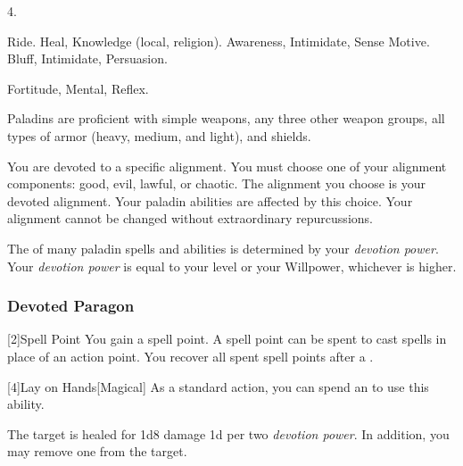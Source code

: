          4.

         Ride.
         Heal, Knowledge (local, religion).
         Awareness, Intimidate, Sense Motive.
         Bluff, Intimidate, Persuasion.

          Fortitude,  Mental,  Reflex.

        Paladins are proficient with simple weapons, any three other weapon groups, all types of armor (heavy, medium, and light), and shields.

        You are devoted to a specific alignment.
        You must choose one of your alignment components: good, evil, lawful, or chaotic.
        The alignment you choose is your devoted alignment.
        Your paladin abilities are affected by this choice.
        Your alignment cannot be changed without extraordinary repurcussions.

        The  of many paladin spells and abilities is determined by your \textit{devotion power}.
        Your \textit{devotion power} is equal to your level or your Willpower, whichever is higher.

        \subsubsection{Devoted Paragon}

            [2]{Spell Point}
            You gain a spell point.
            A spell point can be spent to cast spells in place of an action point.
            You recover all spent spell points after a .

            [4]{Lay on Hands}[Magical] As a standard action, you can spend an  to use this ability.
            \begin{ability}
                \begin{spelltargetinginfo}
                \end{spelltargetinginfo}
                \begin{spelleffects}
                    \spelleffect The target is healed for 1d8 damage \add 1d per two \textit{devotion power}.
                    In addition, you may remove one  from the target.
                \end{spelleffects}
            \end{ability}

